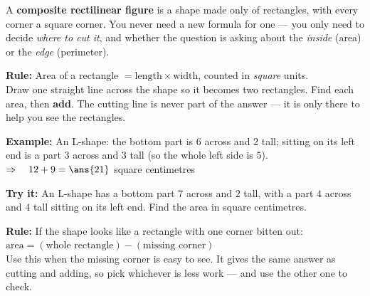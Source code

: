 \documentclass[12pt]{article}
\begin{document}

\noindent\small A \textbf{composite rectilinear figure} is a shape made only of rectangles, with
every corner a square corner. You never need a new formula for one --- you only need to decide
\emph{where to cut it}, and whether the question is asking about the \emph{inside} (area) or the
\emph{edge} (perimeter).\normalsize


\begin{formulabox}
\textbf{Rule:} Area of a rectangle $= \text{length} \times \text{width}$, counted in
\emph{square} units.\\[3pt]
Draw one straight line across the shape so it becomes two rectangles. Find each area, then
\textbf{add}. The cutting line is never part of the answer --- it is only there to help you see
the rectangles.
\end{formulabox}

\begin{examplebox}
\textbf{Example:} An L-shape: the bottom part is $6$ across and $2$ tall; sitting on its left end
is a part $3$ across and $3$ tall (so the whole left side is $5$).
$\Rightarrow\quad 12 + 9 = \ans{21}$ square centimetres
\end{examplebox}

\begin{tryitbox}
\textbf{Try it:} An L-shape has a bottom part $7$ across and $2$ tall, with a part $4$ across and
$4$ tall sitting on its left end. Find the area in square centimetres.\\[2pt]
\end{tryitbox}


\begin{formulabox}
\textbf{Rule:} If the shape looks like a rectangle with one corner bitten out:\\[3pt]
$\text{area} = (\text{whole rectangle}) - (\text{missing corner})$\\[3pt]
Use this when the missing corner is easy to see. It gives the same answer as cutting and adding,
so pick whichever is less work --- and use the other one to check.
\end{formulabox}
\end{document}
